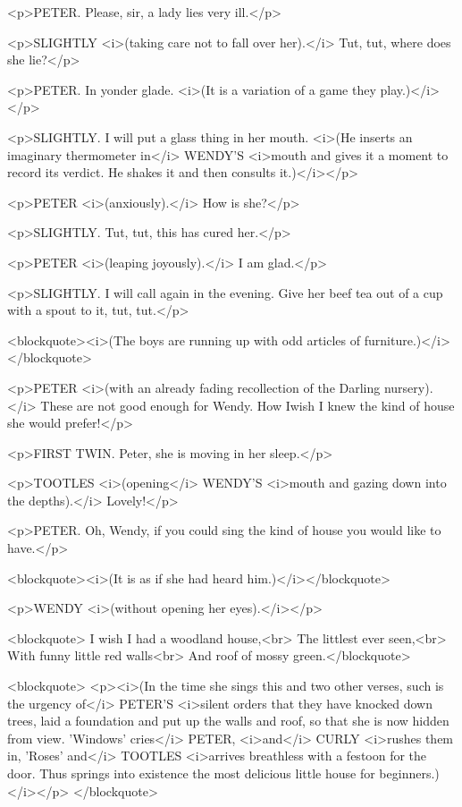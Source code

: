 <p>PETER. Please, sir, a lady lies very ill.</p>

<p>SLIGHTLY <i>(taking care not to fall over her).</i> Tut, tut,
where does she lie?</p>

<p>PETER. In yonder glade. <i>(It is a variation of a game they
play.)</i></p>

<p>SLIGHTLY. I will put a glass thing in her mouth. <i>(He inserts an
imaginary thermometer in</i> WENDY'S <i>mouth and gives it a moment
to record its verdict. He shakes it and then consults it.)</i></p>

<p>PETER <i>(anxiously).</i> How is she?</p>

<p>SLIGHTLY. Tut, tut, this has cured her.</p>

<p>PETER <i>(leaping joyously).</i> I am glad.</p>

<p>SLIGHTLY. I will call again in the evening. Give her beef tea out
of a cup with a spout to it, tut, tut.</p>

<blockquote><i>(The boys are running up with odd articles of
furniture.)</i></blockquote>

<p>PETER <i>(with an already fading recollection of the Darling
nursery).</i> These are not good enough for Wendy. How Iwish I knew
the kind of house she would prefer!</p>

<p>FIRST TWIN. Peter, she is moving in her sleep.</p>

<p>TOOTLES <i>(opening</i> WENDY'S <i>mouth and gazing down into the
depths).</i> Lovely!</p>

<p>PETER. Oh, Wendy, if you could sing the kind of house you would
like to have.</p>

<blockquote><i>(It is as if she had heard him.)</i></blockquote>

<p>WENDY <i>(without opening her eyes).</i></p>

<blockquote>  I wish I had a woodland house,<br>
  The littlest ever seen,<br>
  With funny little red walls<br>
  And roof of mossy green.</blockquote>

<blockquote>
<p><i>(In the time she sings this and two other verses, such is the
urgency of</i> PETER'S <i>silent orders that they have knocked down
trees, laid a foundation and put up the walls and roof, so that she
is now hidden from view. 'Windows' cries</i> PETER, <i>and</i> CURLY
<i>rushes them in, 'Roses' and</i> TOOTLES <i>arrives breathless with
a festoon for the door. Thus springs into existence the most
delicious little house for beginners.)</i></p>
</blockquote>

